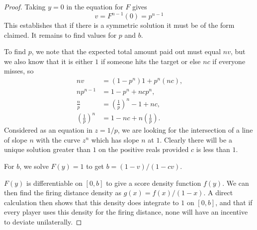 \documentclass[11pt,a4paper]{article}%
\numberwithin{equation}{section}
\theoremstyle{plain}
\begin{document}
\begin{proof}
%
\par
Taking $y = 0$ in the equation for $F$ gives
\begin{equation}
\label{eq:F(0)}
v = F^{n-1}(0) = p^{n - 1}
\end{equation}%
%
This establishes that if there is a symmetric solution it must be of the form claimed. It remains to find values for $p$ and $b$.
%
\par
To find $p$, we note that the expected total amount paid out must equal $nv$, but we also know that it is either $1$ if someone hits the target or else $nc$ if everyone misses, so
\begin{align*}
nv &= \left(1 - p^{n}\right)1 +p^{n}(nc) \text{,}
\\
np^{n - 1} &= 1 - p^{n} + ncp^{n} \text{,}
\\
\frac{n}{p} &= \left( \frac{1}{p} \right) ^{n} - 1 + nc \text{,}
\\
\left( \frac{1}{p} \right) ^{n} &= 1 - nc + n \left( \frac{1}{p} \right) \text{.}
\end{align*}%
%
Considered as an equation in $z = 1/p$, we are looking for the intersection of a line of slope $n$ with the curve $z^{n}$ which has slope $n$ at $1$. Clearly there will be a unique solution greater than $1$ on the positive reals provided $c$ is less than $1$.
%
\par
For $b$, we solve $F(y) = 1$ to get $b = (1 - v)/(1 - cv)$.
%
\par
$F(y)$ is differentiable on $[0, b]$ to give a score density function $f(y)$. We can then find the firing distance density as $g(x) = f(x)/(1 - x)$. A direct calculation then shows that this density does integrate to $1$ on $[0, b]$, and that if every player uses this density for the firing distance, none will have an incentive to deviate unilaterally.
\end{proof}
%
\end{document}
